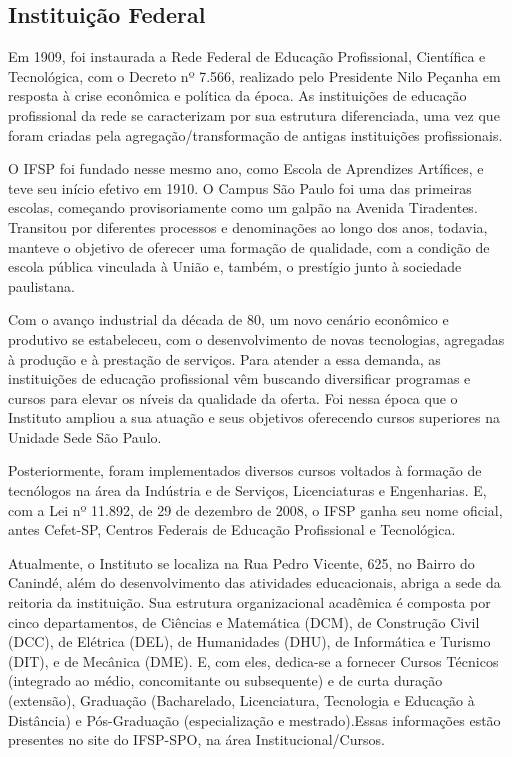 \documentclass[12pt]{article}
\begin{document}
\subsection{Instituição Federal}
\par Em 1909, foi instaurada a Rede Federal de Educação Profissional, Científica e Tecnológica, com o Decreto nº 7.566, realizado pelo Presidente Nilo Peçanha em resposta à crise econômica e política da época. As instituições de educação profissional da rede se caracterizam por sua estrutura diferenciada, uma vez que foram criadas pela agregação/transformação de antigas instituições profissionais. \cite{celia}
\par O IFSP foi fundado nesse mesmo ano, como Escola de Aprendizes Artífices, e teve seu início efetivo em 1910. O Campus São Paulo foi uma das primeiras escolas, começando provisoriamente como um galpão na Avenida Tiradentes. \cite{CSPhist_2016} 
Transitou por diferentes processos e denominações ao longo dos anos, todavia, manteve o objetivo de oferecer uma formação de qualidade, com a condição de escola pública vinculada à União e, também, o prestígio junto à sociedade paulistana. \cite{CSPsobre_2016}
\par Com o avanço industrial da década de 80, um novo cenário econômico e produtivo se estabeleceu, com o desenvolvimento de novas tecnologias, agregadas à produção e à prestação de serviços. Para atender a essa demanda, as instituições de educação profissional vêm buscando diversificar programas e cursos para elevar os níveis da qualidade da oferta. \cite{mec} Foi nessa época que o Instituto ampliou a sua atuação e seus objetivos oferecendo cursos superiores na Unidade Sede São Paulo. \cite{CSPhist_2016}
\par Posteriormente, foram implementados diversos cursos voltados à formação de tecnólogos na área da Indústria e de Serviços, Licenciaturas e Engenharias. \cite{CSPhist_2016} E, com a Lei nº 11.892, de 29 de dezembro de 2008, o IFSP ganha seu nome oficial, antes Cefet-SP, Centros Federais de Educação Profissional e Tecnológica.
\par Atualmente, o Instituto se localiza na Rua Pedro Vicente, 625, no Bairro do Canindé, além do desenvolvimento das atividades educacionais, abriga a sede da reitoria da instituição. \cite{CSPhist_2016} Sua estrutura organizacional acadêmica é composta por cinco departamentos, de Ciências e Matemática (DCM), de Construção Civil (DCC), de Elétrica (DEL), de Humanidades (DHU), de Informática e Turismo (DIT), e de Mecânica (DME). E, com eles, dedica-se a fornecer Cursos Técnicos (integrado ao médio, concomitante ou subsequente) e de curta duração (extensão), Graduação (Bacharelado, Licenciatura, Tecnologia e Educação à Distância) e Pós-Graduação (especialização e mestrado).Essas informações estão presentes no site do IFSP-SPO, na área Institucional/Cursos.
\end{document}

